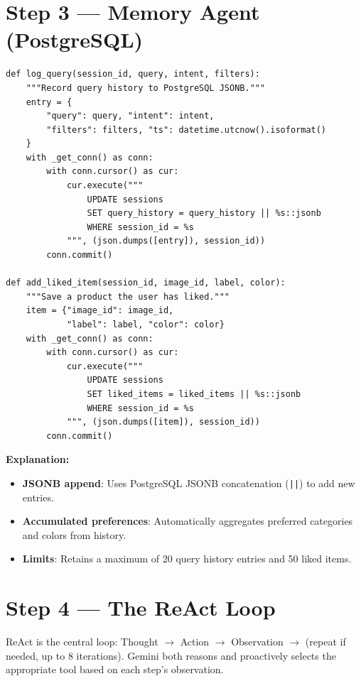 \documentclass[12pt, twoside]{report}
\begin{document}
\section{Step 3 --- Memory Agent (PostgreSQL)}

\begin{lstlisting}[caption={Memory Agent --- agent/memory.py}]
def log_query(session_id, query, intent, filters):
    """Record query history to PostgreSQL JSONB."""
    entry = {
        "query": query, "intent": intent,
        "filters": filters, "ts": datetime.utcnow().isoformat()
    }
    with _get_conn() as conn:
        with conn.cursor() as cur:
            cur.execute("""
                UPDATE sessions
                SET query_history = query_history || %s::jsonb
                WHERE session_id = %s
            """, (json.dumps([entry]), session_id))
        conn.commit()

def add_liked_item(session_id, image_id, label, color):
    """Save a product the user has liked."""
    item = {"image_id": image_id,
            "label": label, "color": color}
    with _get_conn() as conn:
        with conn.cursor() as cur:
            cur.execute("""
                UPDATE sessions
                SET liked_items = liked_items || %s::jsonb
                WHERE session_id = %s
            """, (json.dumps([item]), session_id))
        conn.commit()
\end{lstlisting}

\textbf{Explanation:}
\begin{itemize}
    \item \textbf{JSONB append}: Uses PostgreSQL JSONB concatenation (\texttt{||}) to add new entries.
    \item \textbf{Accumulated preferences}: Automatically aggregates preferred categories and colors from history.
    \item \textbf{Limits}: Retains a maximum of 20 query history entries and 50 liked items.
\end{itemize}

\section{Step 4 --- The ReAct Loop}

\begin{tcolorbox}[title=Method: ReAct (Reason + Act) Loop]
ReAct is the central loop: Thought $\rightarrow$ Action $\rightarrow$ Observation $\rightarrow$ (repeat if needed, up to 8 iterations). Gemini both reasons and proactively selects the appropriate tool based on each step's observation.
\end{tcolorbox}
\end{document}
